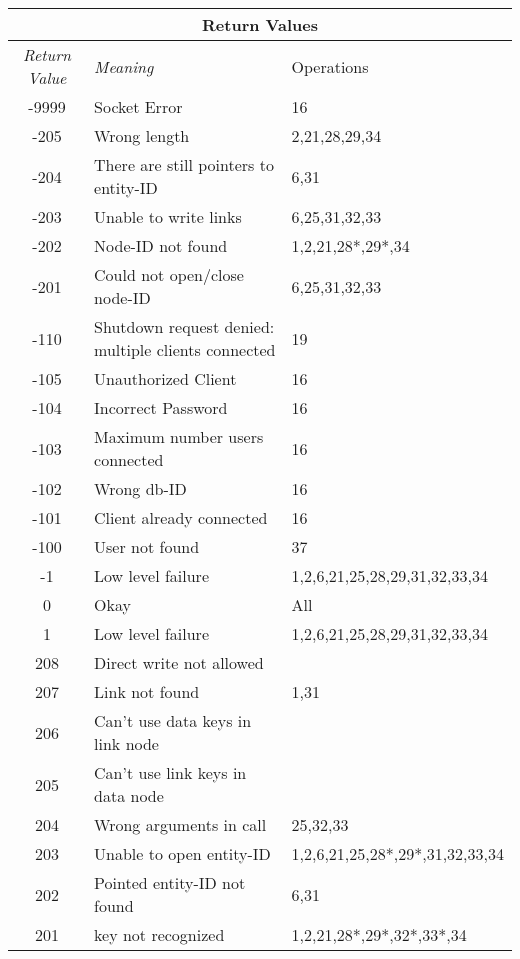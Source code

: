 \small
    \begin{tabular} {|c|l|l|} \hline
      \multicolumn{3}{|c|}{{\bf Return Values}} \\ \hline {\em Return
      Value} & {\em Meaning} & Operations\\ \hline 
      -9999 & Socket Error & 16 \\ \hline 
      -205 & Wrong length & 2,21,28,29,34 \\ \hline
      -204 & There are still pointers to entity-ID & 6,31 \\ \hline 
      -203 & Unable to write links & 6,25,31,32,33 \\ \hline 
      -202 & Node-ID not found & 1,2,21,28*,29*,34 \\ \hline 
      -201 & Could not open/close node-ID & 6,25,31,32,33 \\ \hline 
      -110 & Shutdown request denied: multiple clients connected & 19 \\ \hline 
      -105 & Unauthorized Client & 16 \\ \hline
      -104 & Incorrect Password & 16 \\ \hline
      -103 & Maximum number users connected & 16 \\ \hline 
      -102 & Wrong db-ID  & 16 \\ \hline 
      -101 & Client already connected & 16 \\ \hline 
      -100 & User not found & 37 \\ \hline
      -1 & Low level failure & 1,2,6,21,25,28,29,31,32,33,34 \\ \hline
      0 & Okay & All \\ \hline 
      1 & Low level failure & 1,2,6,21,25,28,29,31,32,33,34 \\ \hline
      208 & Direct write not allowed &  \\ \hline 
      207 & Link not found & 1,31 \\ \hline 
      206 & Can't use data keys in link node &  \\ \hline 
      205 & Can't use link keys in data node &  \\ \hline 
      204 & Wrong arguments in call & 25,32,33 \\ \hline 
      203 & Unable to open entity-ID & 1,2,6,21,25,28*,29*,31,32,33,34 \\ \hline 
      202 & Pointed entity-ID not found & 6,31 \\ \hline 
      201 & key not recognized & 1,2,21,28*,29*,32*,33*,34 \\ \hline

\end{tabular}
